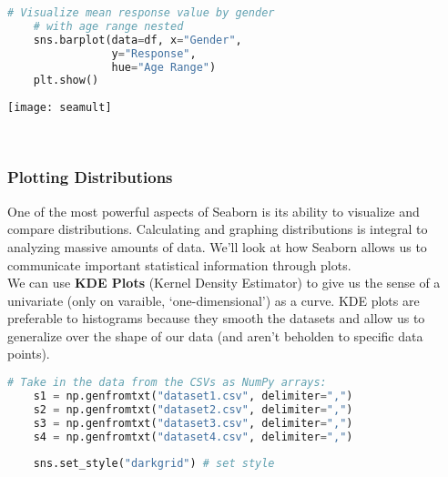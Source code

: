 \documentclass[11pt, a4paper]{article}
\begin{document}
\begin{spacing}{1.1}
\begin{minipage}[c]{9cm}
\begin{lstlisting}[language=Python]
	# Visualize mean response value by gender 
	# with age range nested
	sns.barplot(data=df, x="Gender", 
	            y="Response", 
	            hue="Age Range")
	plt.show() \end{lstlisting}\vspace*{1mm}
	\end{minipage}
	\begin{minipage}[c]{10cm}
		\hspace*{5mm} \texttt{[image: seamult]}
	\end{minipage} \\
	\subsubsection{Plotting Distributions}
	One of the most powerful aspects of Seaborn is its ability to visualize and compare distributions. Calculating and graphing distributions is integral to analyzing massive amounts of data. We’ll look at how Seaborn allows us to communicate important statistical information through plots. \vspace*{2mm} \\
	We can use \textbf{KDE Plots} (Kernel Density Estimator) to give us the sense of a univariate (only on varaible, `one-dimensional') as a curve. KDE plots are preferable to histograms because they smooth the datasets and allow us to generalize over the shape of our data (and aren't beholden to specific data points).
	\begin{minipage}[c]{10.3cm}
	\begin{lstlisting}[language=Python]
	# Take in the data from the CSVs as NumPy arrays:
	s1 = np.genfromtxt("dataset1.csv", delimiter=",")
	s2 = np.genfromtxt("dataset2.csv", delimiter=",")
	s3 = np.genfromtxt("dataset3.csv", delimiter=",")
	s4 = np.genfromtxt("dataset4.csv", delimiter=",")
	
	sns.set_style("darkgrid") # set style
	

\end{lstlisting}
\end{minipage}
\end{spacing}
\end{document}
